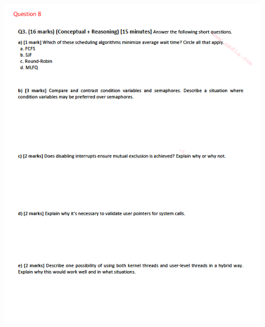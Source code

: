 \documentclass[12pt]{article}
\begin{document}
\begin{center}
    \includegraphics[width=\linewidth]{../images/midterm_5_8.png}
\end{center}
\end{document}
